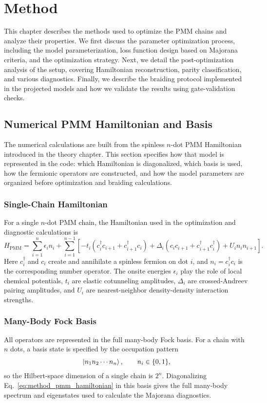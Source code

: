 \chapter{Method}

This chapter describes the methods used to optimize the PMM chains and analyze their properties. We first discuss the parameter optimization process, including the model parameterization, loss function design based on Majorana criteria, and the optimization strategy. Next, we detail the post-optimization analysis of the setup, covering Hamiltonian reconstruction, parity classification, and various diagnostics. Finally, we describe the braiding protocol implemented in the projected models and how we validate the results using gate-validation checks.

\section{Numerical PMM Hamiltonian and Basis}
The numerical calculations are built from the spinless $n$-dot PMM Hamiltonian introduced in the theory chapter. This section specifies how that model is represented in the code: which Hamiltonian is diagonalized, which basis is used, how the fermionic operators are constructed, and how the model parameters are organized before optimization and braiding calculations.

\subsection{Single-Chain Hamiltonian}
For a single $n$-dot PMM chain, the Hamiltonian used in the optimization and diagnostic calculations is
\begin{equation}
H_{\mathrm{PMM}}
=
\sum_{i=1}^{n} \epsilon_i n_i
+ \sum_{i=1}^{n-1}
\left[
-t_i\left(c_i^\dagger c_{i+1}+c_{i+1}^\dagger c_i\right)
+\Delta_i\left(c_i c_{i+1}+c_{i+1}^\dagger c_i^\dagger\right)
+U_i n_i n_{i+1}
\right].
\label{eq:method_pmm_hamiltonian}
\end{equation}
Here $c_i^\dagger$ and $c_i$ create and annihilate a spinless fermion on dot $i$, and $n_i=c_i^\dagger c_i$ is the corresponding number operator. The onsite energies $\epsilon_i$ play the role of local chemical potentials, $t_i$ are elastic cotunneling amplitudes, $\Delta_i$ are crossed-Andreev pairing amplitudes, and $U_i$ are nearest-neighbor density-density interaction strengths.

\subsection{Many-Body Fock Basis}
All operators are represented in the full many-body Fock basis. For a chain with $n$ dots, a basis state is specified by the occupation pattern
\begin{equation}
\ket{n_1 n_2 \cdots n_n},
\qquad
n_i\in\{0,1\},
\end{equation}
so the Hilbert-space dimension of a single chain is $2^n$. Diagonalizing Eq.~\ref{eq:method_pmm_hamiltonian} in this basis gives the full many-body spectrum and eigenstates used to calculate the Majorana diagnostics.

